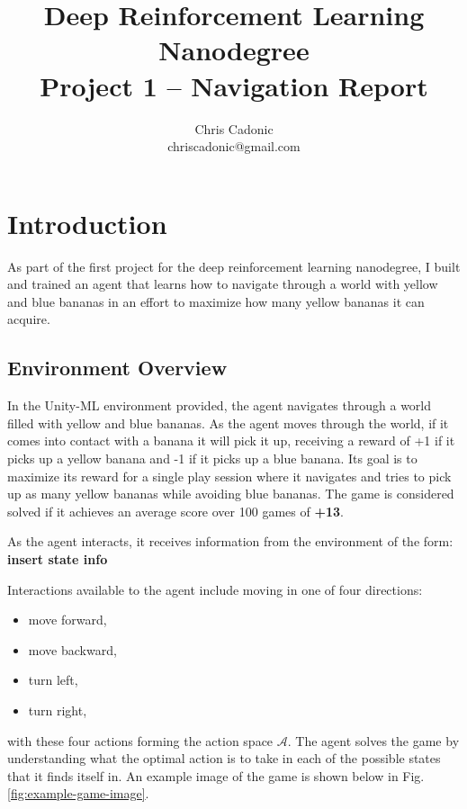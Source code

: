\documentclass[11pt]{article}
\begin{document}
\title{Deep Reinforcement Learning Nanodegree\\
	   Project 1 -- Navigation Report}
\author{\vspace{-1mm}Chris Cadonic\\
chriscadonic@gmail.com}
\maketitle
\vspace{-1.5em}

\section{Introduction}

As part of the first project for the deep reinforcement learning nanodegree, I built and trained an agent that learns how to navigate through a world with yellow and blue bananas in an effort to maximize how many yellow bananas it can acquire.

\subsection{Environment Overview}

In the Unity-ML environment provided, the agent navigates through a world filled with yellow and blue bananas. As the agent moves through the world, if it comes into contact with a banana it will pick it up, receiving a reward of +1 if it picks up a yellow banana and -1 if it picks up a blue banana. Its goal is to maximize its reward for a single play session where it navigates and tries to pick up as many yellow bananas while avoiding blue bananas. The game is considered solved if it achieves an average score over 100 games of \textbf{+13}.

As the agent interacts, it receives information from the environment of the form:
\textbf{insert state info}

Interactions available to the agent include moving in one of four directions:
\begin{itemize}
	\item move forward,
	\item move backward,
	\item turn left,
	\item turn right,
\end{itemize}
with these four actions forming the action space $\mathcal{A}$. The agent solves the game by understanding what the optimal action is to take in each of the possible states that it finds itself in. An example image of the game is shown below in Fig. \ref{fig:example-game-image}.
\end{document}
